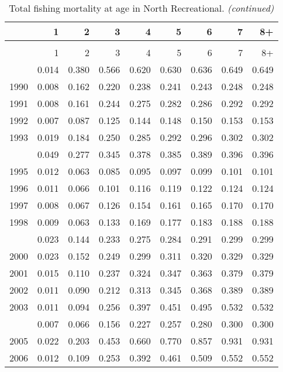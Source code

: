 \documentclass[
]{article}
\begin{document}
\begin{longtable}[t]{lrrrrrrrr}
\caption{\label{tab:North_Recreational-fleet-FAA-table}Total fishing mortality at age in North Recreational.}\\
\toprule
  & 1 & 2 & 3 & 4 & 5 & 6 & 7 & 8+\\
\midrule
\endfirsthead
\caption[]{Total fishing mortality at age in North Recreational. \textit{(continued)}}\\
\toprule
  & 1 & 2 & 3 & 4 & 5 & 6 & 7 & 8+\\
\midrule
\endhead

\endfoot
\bottomrule
\endlastfoot
1989 & 0.014 & 0.380 & 0.566 & 0.620 & 0.630 & 0.636 & 0.649 & 0.649\\
1990 & 0.008 & 0.162 & 0.220 & 0.238 & 0.241 & 0.243 & 0.248 & 0.248\\
1991 & 0.008 & 0.161 & 0.244 & 0.275 & 0.282 & 0.286 & 0.292 & 0.292\\
1992 & 0.007 & 0.087 & 0.125 & 0.144 & 0.148 & 0.150 & 0.153 & 0.153\\
1993 & 0.019 & 0.184 & 0.250 & 0.285 & 0.292 & 0.296 & 0.302 & 0.302\\
\addlinespace
1994 & 0.049 & 0.277 & 0.345 & 0.378 & 0.385 & 0.389 & 0.396 & 0.396\\
1995 & 0.012 & 0.063 & 0.085 & 0.095 & 0.097 & 0.099 & 0.101 & 0.101\\
1996 & 0.011 & 0.066 & 0.101 & 0.116 & 0.119 & 0.122 & 0.124 & 0.124\\
1997 & 0.008 & 0.067 & 0.126 & 0.154 & 0.161 & 0.165 & 0.170 & 0.170\\
1998 & 0.009 & 0.063 & 0.133 & 0.169 & 0.177 & 0.183 & 0.188 & 0.188\\
\addlinespace
1999 & 0.023 & 0.144 & 0.233 & 0.275 & 0.284 & 0.291 & 0.299 & 0.299\\
2000 & 0.023 & 0.152 & 0.249 & 0.299 & 0.311 & 0.320 & 0.329 & 0.329\\
2001 & 0.015 & 0.110 & 0.237 & 0.324 & 0.347 & 0.363 & 0.379 & 0.379\\
2002 & 0.011 & 0.090 & 0.212 & 0.313 & 0.345 & 0.368 & 0.389 & 0.389\\
2003 & 0.011 & 0.094 & 0.256 & 0.397 & 0.451 & 0.495 & 0.532 & 0.532\\
\addlinespace
2004 & 0.007 & 0.066 & 0.156 & 0.227 & 0.257 & 0.280 & 0.300 & 0.300\\
2005 & 0.022 & 0.203 & 0.453 & 0.660 & 0.770 & 0.857 & 0.931 & 0.931\\
2006 & 0.012 & 0.109 & 0.253 & 0.392 & 0.461 & 0.509 & 0.552 & 0.552\\

\end{longtable}
\end{document}
